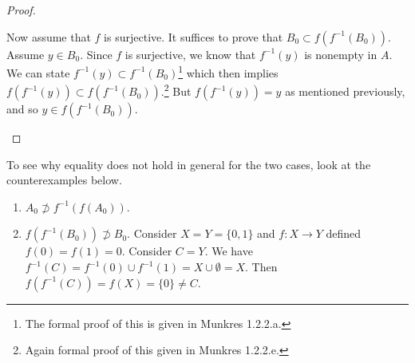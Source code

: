 \documentclass{article}
\begin{document}
\begin{proof}
\begin{enumerate}
        Now assume that $f$ is surjective. It suffices to prove that $B_0 \subset f (f^{-1}(B_0))$. Assume $y \in B_0$. Since $f$ is surjective, we know that $f^{-1} (y)$ is nonempty in $A$. We can state $f^{-1}(y) \subset f^{-1} (B_0)$\footnote{The formal proof of this is given in Munkres 1.2.2.a.} which then implies $f(f^{-1} (y)) \subset f (f^{-1} (B_0))$.\footnote{Again formal proof of this given in Munkres 1.2.2.e.} But $f (f^{-1} (y)) = y$ as mentioned previously, and so $y \in f(f^{-1} (B_0))$. 
      \end{enumerate}
    \end{proof}

    \begin{example}
      To see why equality does not hold in general for the two cases, look at the counterexamples below. 
      \begin{enumerate}
        \item $A_0 \not\supset f^{-1} (f(A_0))$. 
        \item $f(f^{-1}(B_0)) \not\supset B_0$. Consider $X = Y = \{0, 1\}$ and $f: X \rightarrow Y$ defined $f(0) = f(1) = 0$. Consider $C = Y$. We have $f^{-1} (C) = f^{-1} (0) \cup f^{-1} (1) = X \cup \emptyset = X$. Then $f(f^{-1} (C)) = f(X) = \{0\} \neq C$. 
      \end{enumerate}
    \end{example}
\end{document}
